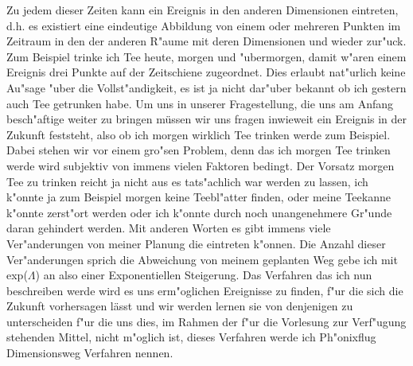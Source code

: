 \documentclass[a5paper,8pt]{book}
\begin{document}
Zu jedem dieser Zeiten kann ein Ereignis in den anderen Dimensionen eintreten, d.h. es existiert eine eindeutige Abbildung von einem oder mehreren Punkten im Zeitraum in 
den der anderen R"aume mit deren Dimensionen und wieder zur"uck. Zum Beispiel trinke ich Tee heute, morgen und "ubermorgen, damit w"aren einem Ereignis drei Punkte auf 
der Zeitschiene zugeordnet. Dies erlaubt nat"urlich keine Au"sage "uber die Vollst"andigkeit, es ist ja nicht dar"uber bekannt ob ich gestern auch Tee getrunken habe.
Um uns in unserer Fragestellung, die uns am Anfang besch"aftige weiter zu bringen müssen wir uns fragen inwieweit ein Ereignis in der Zukunft feststeht, also ob ich 
morgen wirklich Tee trinken werde zum Beispiel. Dabei stehen wir vor einem gro"sen Problem, denn das ich morgen Tee trinken werde wird subjektiv von immens vielen Faktoren 
bedingt. Der Vorsatz morgen Tee zu trinken reicht ja nicht aus es tats"achlich war werden zu lassen, ich k"onnte ja zum Beispiel morgen keine Teebl"atter finden, oder meine 
Teekanne k"onnte zerst"ort werden oder ich k"onnte durch noch unangenehmere Gr"unde daran gehindert werden.
Mit anderen Worten es gibt immens viele Ver"anderungen von meiner Planung die eintreten k"onnen. Die Anzahl dieser Ver"anderungen sprich die Abweichung von meinem geplanten 
Weg gebe ich mit exp($\Lambda$) an also einer Exponentiellen Steigerung.
Das Verfahren das ich nun beschreiben werde wird es uns erm"oglichen Ereignisse zu finden, f"ur die sich die Zukunft vorhersagen lässt und wir werden lernen sie von 
denjenigen zu unterscheiden f"ur die uns dies, im Rahmen der f"ur die Vorlesung zur Verf"ugung stehenden Mittel, nicht m"oglich ist, dieses Verfahren werde ich Ph"onixflug 
Dimensionsweg Verfahren nennen.\\
\end{document}
